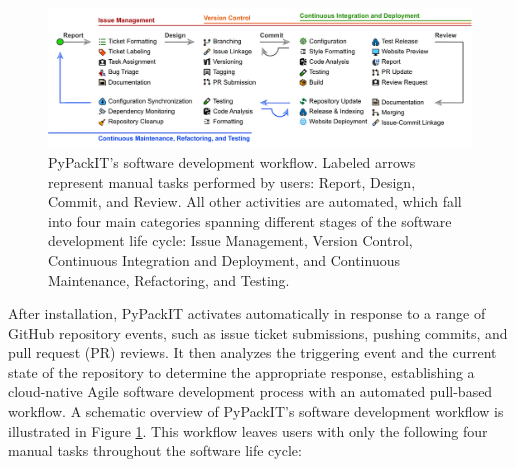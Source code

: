 \documentclass{article}
\begin{document}
\begin{figure}[ht]
    \centering
    \includegraphics[width=1\linewidth]{Fig1.pdf}
    \caption{PyPackIT's software development workflow. Labeled arrows represent manual tasks performed by users: Report, Design, Commit, and Review. All other activities are automated, which fall into four main categories spanning different stages of the software development life cycle: Issue Management, Version Control, Continuous Integration and Deployment, and Continuous Maintenance, Refactoring, and Testing.}
    \label{fig:workflow}
\end{figure}

After installation, PyPackIT activates automatically in response to a range of GitHub repository events, such as issue ticket submissions, pushing commits, and pull request (PR) reviews. It then analyzes the triggering event and the current state of the repository to determine the appropriate response, establishing a cloud-native Agile software development process with an automated pull-based workflow. A schematic overview of PyPackIT's software development workflow is illustrated in Figure \ref{fig:workflow}. This workflow leaves users with only the following four manual tasks throughout the software life cycle:
\end{document}
